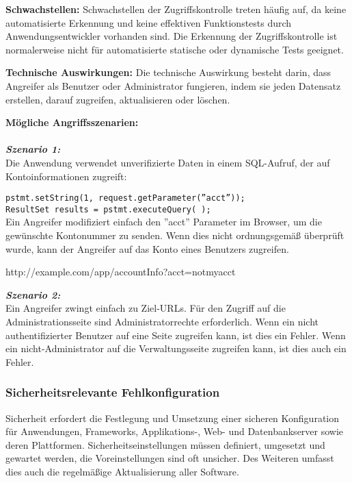 \textbf{Schwachstellen:} Schwachstellen der Zugriffskontrolle treten häufig auf, da keine automatisierte Erkennung und keine effektiven Funktionstests durch Anwendungsentwickler vorhanden sind. Die Erkennung der Zugriffskontrolle ist normalerweise nicht für automatisierte statische oder dynamische Tests geeignet\cite[11]{owasp17top10}.

\textbf{Technische Auswirkungen:} Die technische Auswirkung besteht darin, dass Angreifer als Benutzer oder Administrator fungieren, indem sie jeden Datensatz erstellen, darauf zugreifen, aktualisieren oder löschen\cite[11]{owasp17top10}.

\textbf{Mögliche Angriffsszenarien:}\\
\\
\textbf{\textit{Szenario 1:}}\\
Die Anwendung verwendet unverifizierte Daten in einem SQL-Aufruf, der auf Kontoinformationen zugreift\cite[11]{owasp17top10}:

\texttt{pstmt.setString(1, request.getParameter(''acct''));\\
	ResultSet results = pstmt.executeQuery( );}\\
Ein Angreifer modifiziert einfach den ''acct'' Parameter im Browser, um die gewünschte Kontonummer zu senden. Wenn dies nicht ordnungsgemäß überprüft wurde, kann der Angreifer auf das Konto eines Benutzers zugreifen.

http://example.com/app/accountInfo?acct=notmyacct

\textbf{\textit{Szenario 2:}}\\
Ein Angreifer zwingt einfach zu Ziel-URLs. Für den Zugriff auf die Administrationsseite sind Administratorrechte erforderlich. Wenn ein nicht authentifizierter Benutzer auf eine Seite zugreifen kann, ist dies ein Fehler. Wenn ein nicht-Administrator auf die Verwaltungsseite zugreifen kann, ist dies auch ein Fehler\cite[11]{owasp17top10}.

\subsubsection{Sicherheitsrelevante Fehlkonfiguration}

Sicherheit erfordert die Festlegung und Umsetzung einer sicheren Konfiguration für Anwendungen, Frameworks, Applikations-, Web- und Datenbankserver sowie deren Plattformen. Sicherheitseinstellungen müssen definiert, umgesetzt und gewartet werden, die Voreinstellungen sind oft unsicher. Des Weiteren umfasst dies auch die regelmäßige Aktualisierung aller Software\cite[6]{owasp17top10}.

